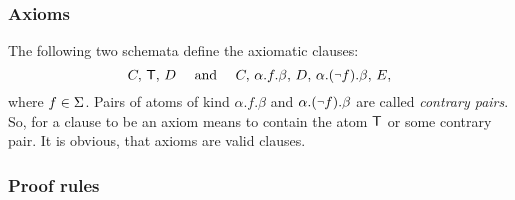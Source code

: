 \subsubsection{Axioms}

The following two schemata define the axiomatic clauses:
\begin{equation}
C,\,\true,\, D \quad\mbox{ and }\quad C,\,\alpha. f.\beta ,\,D ,\,\alpha.(\Neg
f).\beta ,\,E,
\end{equation}
where \(f\in\Sigma\).  Pairs of atoms of kind \(\alpha. f.\beta\) and
\(\alpha.(\Neg f).\beta\) are called {\em contrary pairs}.  So, for a clause
to be an axiom means to contain the atom ${\sf T}$ or some contrary pair.  It
is obvious, that axioms are valid clauses.

\subsubsection{Proof rules}

